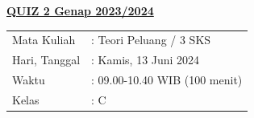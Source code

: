\documentclass[12pt,a4paper]{article}
\begin{document}
\begin{center}
  \underline{\textbf{QUIZ 2 Genap 2023/2024}}
\end{center}

\vspace{0.5cm}

\begin{center}
  \begin{tabular}{ll}
    Mata Kuliah   & : Teori Peluang / 3 SKS       \\
    Hari, Tanggal & : Kamis, 13 Juni 2024         \\
    Waktu         & : 09.00-10.40 WIB (100 menit) \\
    Kelas         & : C
  \end{tabular}
\end{center}

\vspace{0.5cm}
\end{document}
